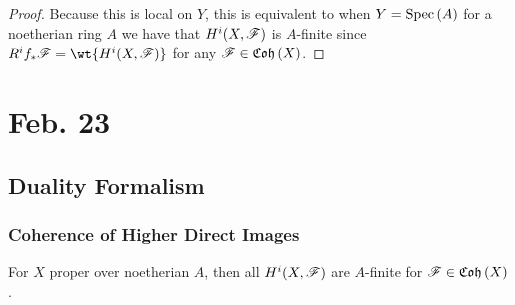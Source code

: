 \documentclass[12pt]{article}
\begin{document}
\begin{proof}
Because this is local on $Y$, this is equivalent to when $Y = \mathrm{Spec}\left( A \right)$ for a noetherian ring $A$ we have that $H^i(X, \mathscr{F})$ is $A$-finite since $R^i f_* \F = \wt{H^i(X, \F)}$ for any $\mathscr{F} \in \mathfrak{Coh}\left(X\right)$. 
\end{proof}

\section{Feb. 23}

\subsection{Duality Formalism}

\subsubsection{Coherence of Higher Direct Images}

\begin{thm}
For $X$ proper over noetherian $A$, then all $H^i(X, \mathscr{F})$ are $A$-finite for $\mathscr{F} \in \mathfrak{Coh}\left(X\right)$. 
\end{thm}
\end{document}
